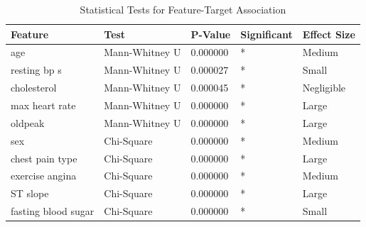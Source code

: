 \begin{table}
\caption{Statistical Tests for Feature-Target Association}
\label{tab:stat_tests}
\begin{tabular}{lllll}
\toprule
Feature & Test & P-Value & Significant & Effect Size \\
\midrule
age & Mann-Whitney U & 0.000000 & * & Medium \\
resting bp s & Mann-Whitney U & 0.000027 & * & Small \\
cholesterol & Mann-Whitney U & 0.000045 & * & Negligible \\
max heart rate & Mann-Whitney U & 0.000000 & * & Large \\
oldpeak & Mann-Whitney U & 0.000000 & * & Large \\
sex & Chi-Square & 0.000000 & * & Medium \\
chest pain type & Chi-Square & 0.000000 & * & Large \\
exercise angina & Chi-Square & 0.000000 & * & Medium \\
ST slope & Chi-Square & 0.000000 & * & Large \\
fasting blood sugar & Chi-Square & 0.000000 & * & Small \\
\bottomrule
\end{tabular}
\end{table}
